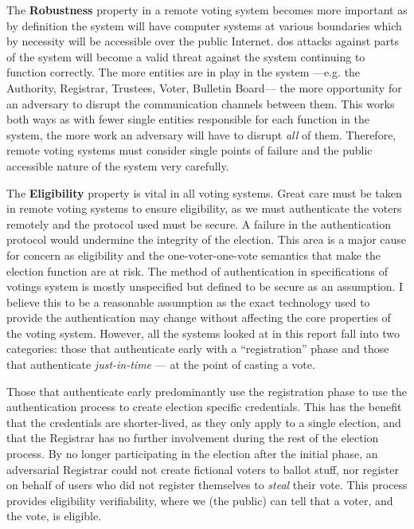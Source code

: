 The \textbf{Robustness} property in a remote voting system becomes more important as by definition the system will have computer systems at various boundaries which by necessity will be accessible over the public Internet. \Gls{dos} attacks against parts of the system will become a valid threat against the system continuing to function correctly. The more entities are in play in the system ---e.g. the Authority, Registrar, Trustees, Voter, Bulletin Board--- the more opportunity for an adversary to disrupt the communication channels between them. This works both ways as with fewer single entities responsible for each function in the system, the more work an adversary will have to disrupt \emph{all} of them. Therefore, remote voting systems must consider single points of failure and the public accessible nature of the system very carefully.

The \textbf{Eligibility} property is vital in all voting systems. Great care must be taken in remote voting systems to ensure eligibility, as we must authenticate the voters remotely and the protocol used must be secure. A failure in the authentication protocol would undermine the integrity of the election. This area is a major cause for concern as eligibility and the one-voter-one-vote semantics that make the election function are at risk. The method of authentication in specifications of votings system is mostly unspecified but defined to be secure as an assumption. I believe this to be a reasonable assumption as the exact technology used to provide the authentication may change without affecting the core properties of the voting system. However, all the systems looked at in this report fall into two categories: those that authenticate early with a ``registration'' phase and those that authenticate \emph{just-in-time} --- at the point of casting a vote.

Those that authenticate early predominantly use the registration phase to use the authentication process to create election specific credentials. This has the benefit that the credentials are shorter-lived, as they only apply to a single election, and that the Registrar has no further involvement during the rest of the election process. By no longer participating in the election after the initial phase, an adversarial Registrar could not create fictional voters to ballot stuff, nor register on behalf of users who did not register themselves to \emph{steal} their vote. This process provides eligibility verifiability, where we (the public) can tell that a voter, and the vote, is eligible.


